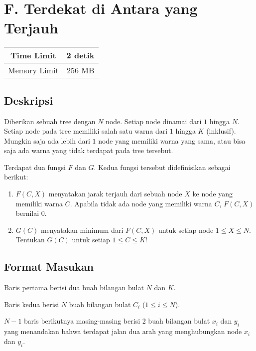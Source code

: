 \documentclass{article}
\begin{document}
\section*{\hfil F. Terdekat di Antara yang Terjauh\hfil}

\begin{center}
\begin{tabular}{ |cc| } 
 \hline
 Time Limit & 2 detik \\ 
 \hline
 Memory Limit & 256 MB \\
 \hline
\end{tabular}
\end{center}

\subsection*{Deskripsi}
\par\noindent
Diberikan sebuah tree dengan $N$ node. Setiap node dinamai dari $1$ hingga $N$. Setiap node pada tree memiliki salah satu warna dari $1$ hingga $K$ (inklusif). Mungkin saja ada lebih dari $1$ node yang memiliki warna yang sama, atau bisa saja ada warna yang tidak terdapat pada tree tersebut. 
\newline\par\noindent
Terdapat dua fungsi $F$ dan $G$. Kedua fungsi tersebut didefinisikan sebagai berikut:
\begin{enumerate}
\item $F(C, X)$ menyatakan jarak terjauh dari sebuah node $X$ ke node yang memiliki warna $C$. Apabila tidak ada node yang memiliki warna $C$, $F(C, X)$ bernilai $0$.
\item $G(C)$ menyatakan minimum dari $F(C, X)$ untuk setiap node $1 \leq X \leq N$. Tentukan $G(C)$ untuk setiap $1 \leq C \leq K$!
\end{enumerate}

\subsection*{Format Masukan}
\par\noindent
Baris pertama berisi dua buah bilangan bulat $N$ dan $K$.
\newline\par\noindent
Baris kedua berisi $N$ buah bilangan bulat $C_i$ ($1 \leq i \leq N$).
\newline\par\noindent
$N - 1$ baris berikutnya masing-masing berisi 2 buah bilangan bulat $x_i$ dan $y_i$ yang menandakan bahwa terdapat jalan dua arah yang menghubungkan node $x_i$ dan $y_i$.
\end{document}
